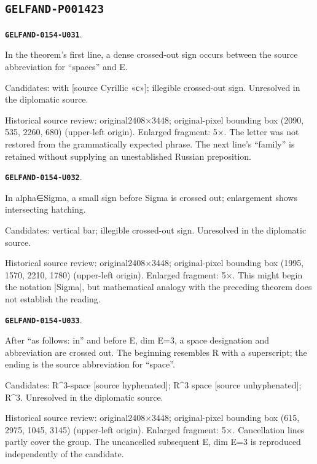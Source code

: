\documentclass[11pt]{article}
\theoremstyle{definition}
\theoremstyle{remark}
\begin{document}
\subsection*{\texttt{GELFAND-P001423}}
\par\noindent\leavevmode{}\label{GELFAND-0154-U031}\label{GELFAND-P001423:theorem-cancelled-sign:note}\textbf{\texttt{GELFAND-0154-U031}}.\nopagebreak[4]\par
In the theorem’s first line, a dense crossed-out sign occurs between the source abbreviation for “spaces” and E.\par
Candidates: with [source Cyrillic «с»]; illegible crossed-out sign. Unresolved in the diplomatic source.\par
Historical source review: original2408×3448; original-pixel bounding box (2090, 535, 2260, 680) (upper-left origin). Enlarged fragment: 5×. The letter was not restored from the grammatically expected phrase. The next line’s “family” is retained without supplying an unestablished Russian preposition.\par\medskip
\par\noindent\leavevmode{}\label{GELFAND-0154-U032}\label{GELFAND-P001423:representation-cancelled-sign:note}\textbf{\texttt{GELFAND-0154-U032}}.\nopagebreak[4]\par
In alpha∈Sigma, a small sign before Sigma is crossed out; enlargement shows intersecting hatching.\par
Candidates: vertical bar; illegible crossed-out sign. Unresolved in the diplomatic source.\par
Historical source review: original2408×3448; original-pixel bounding box (1995, 1570, 2210, 1780) (upper-left origin). Enlarged fragment: 5×. This might begin the notation |Sigma|, but mathematical analogy with the preceding theorem does not establish the reading.\par\medskip
\par\noindent\leavevmode{}\label{GELFAND-0154-U033}\label{GELFAND-P001423:tetrahedron-cancelled-space:note}\textbf{\texttt{GELFAND-0154-U033}}.\nopagebreak[4]\par
After “as follows: in” and before E, dim E=3, a space designation and abbreviation are crossed out. The beginning resembles R with a superscript; the ending is the source abbreviation for “space”.\par
Candidates: R\textasciicircum{}3-space [source hyphenated]; R\textasciicircum{}3 space [source unhyphenated]; R\textasciicircum{}3. Unresolved in the diplomatic source.\par
Historical source review: original2408×3448; original-pixel bounding box (615, 2975, 1045, 3145) (upper-left origin). Enlarged fragment: 5×. Cancellation lines partly cover the group. The uncancelled subsequent E, dim E=3 is reproduced independently of the candidate.\par\medskip
\end{document}
